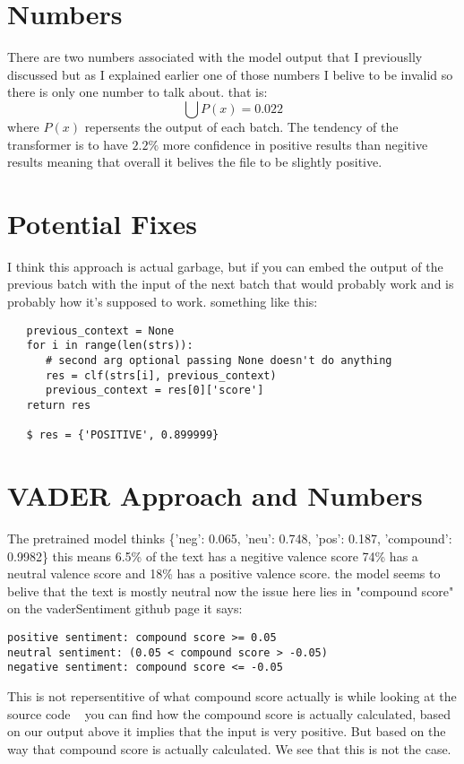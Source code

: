 \documentclass[12pt]{article}
\begin{document}
\newpage
\section{Numbers}
There are two numbers associated with the model output that I previouslly discussed but as I explained
earlier one of those numbers I belive to be invalid so there is only one number to talk about.
that is: $$ \bigcup{P(x)} = 0.022 $$ where $P(x)$ repersents the output of each batch.
The tendency of the transformer is to have $2.2\%$ more confidence in positive results
than negitive results
meaning that overall it belives the file to be slightly positive.

\section{Potential Fixes}
I think this approach is actual garbage, but if you can embed the output of the previous batch
with the input of the next batch that would probably work and is probably how it's supposed to work.
something like this:
\begin{verbatim}
   previous_context = None
   for i in range(len(strs)):
      # second arg optional passing None doesn't do anything
      res = clf(strs[i], previous_context) 
      previous_context = res[0]['score']
   return res

   $ res = {'POSITIVE', 0.899999}
\end{verbatim}

\newpage
\section{VADER Approach and Numbers}
The pretrained model thinks \{'neg': 0.065, 'neu': 0.748, 'pos': 0.187, 'compound': 0.9982\}
this means 6.5\% of the text has a negitive valence
score 74\% has a neutral valence score and 18\% has a positive
valence score.
the model seems to belive that the text is mostly neutral
now the issue here lies in "compound score"
on the vaderSentiment github page it says:
\begin{verbatim}
positive sentiment: compound score >= 0.05
neutral sentiment: (0.05 < compound score > -0.05) 
negative sentiment: compound score <= -0.05
\end{verbatim}
This is not repersentitive of what compound score actually is while looking
at the source code ~\cite{vadercode}
you can find how the compound score is actually calculated, based on our
output above it implies that the input is very positive. But based on 
the way that compound score is actually calculated. We see that this is
not the case.
\end{document}
